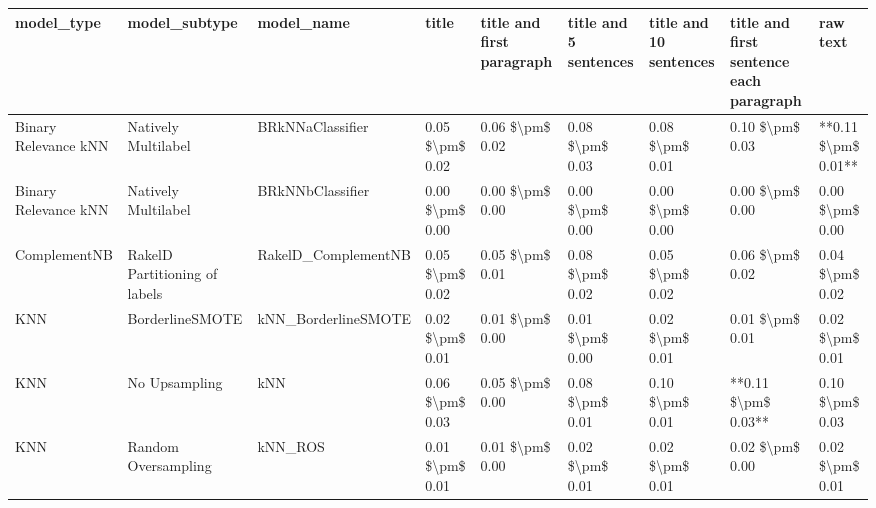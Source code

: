 \begin{tabular}{lllllllll}
\toprule
                     model\_type &                 model\_subtype &                                   model\_name &           title & title and first paragraph & title and 5 sentences & title and 10 sentences & title and first sentence each paragraph &            raw text \\
\midrule
           Binary Relevance kNN &           Natively Multilabel &                             BRkNNaClassifier & 0.05 \$\textbackslash pm\$ 0.02 &           0.06 \$\textbackslash pm\$ 0.02 &       0.08 \$\textbackslash pm\$ 0.03 &        0.08 \$\textbackslash pm\$ 0.01 &                         0.10 \$\textbackslash pm\$ 0.03 & **0.11 \$\textbackslash pm\$ 0.01** \\
           Binary Relevance kNN &           Natively Multilabel &                             BRkNNbClassifier & 0.00 \$\textbackslash pm\$ 0.00 &           0.00 \$\textbackslash pm\$ 0.00 &       0.00 \$\textbackslash pm\$ 0.00 &        0.00 \$\textbackslash pm\$ 0.00 &                         0.00 \$\textbackslash pm\$ 0.00 &     0.00 \$\textbackslash pm\$ 0.00 \\
                   ComplementNB & RakelD Partitioning of labels &                          RakelD\_ComplementNB & 0.05 \$\textbackslash pm\$ 0.02 &           0.05 \$\textbackslash pm\$ 0.01 &       0.08 \$\textbackslash pm\$ 0.02 &        0.05 \$\textbackslash pm\$ 0.02 &                         0.06 \$\textbackslash pm\$ 0.02 &     0.04 \$\textbackslash pm\$ 0.02 \\
                            KNN &               BorderlineSMOTE &                          kNN\_BorderlineSMOTE & 0.02 \$\textbackslash pm\$ 0.01 &           0.01 \$\textbackslash pm\$ 0.00 &       0.01 \$\textbackslash pm\$ 0.00 &        0.02 \$\textbackslash pm\$ 0.01 &                         0.01 \$\textbackslash pm\$ 0.01 &     0.02 \$\textbackslash pm\$ 0.01 \\
                            KNN &                 No Upsampling &                                          kNN & 0.06 \$\textbackslash pm\$ 0.03 &           0.05 \$\textbackslash pm\$ 0.00 &       0.08 \$\textbackslash pm\$ 0.01 &        0.10 \$\textbackslash pm\$ 0.01 &                     **0.11 \$\textbackslash pm\$ 0.03** &     0.10 \$\textbackslash pm\$ 0.03 \\
                            KNN &           Random Oversampling &                                      kNN\_ROS & 0.01 \$\textbackslash pm\$ 0.01 &           0.01 \$\textbackslash pm\$ 0.00 &       0.02 \$\textbackslash pm\$ 0.01 &        0.02 \$\textbackslash pm\$ 0.01 &                         0.02 \$\textbackslash pm\$ 0.00 &     0.02 \$\textbackslash pm\$ 0.01 \\

\end{tabular}
